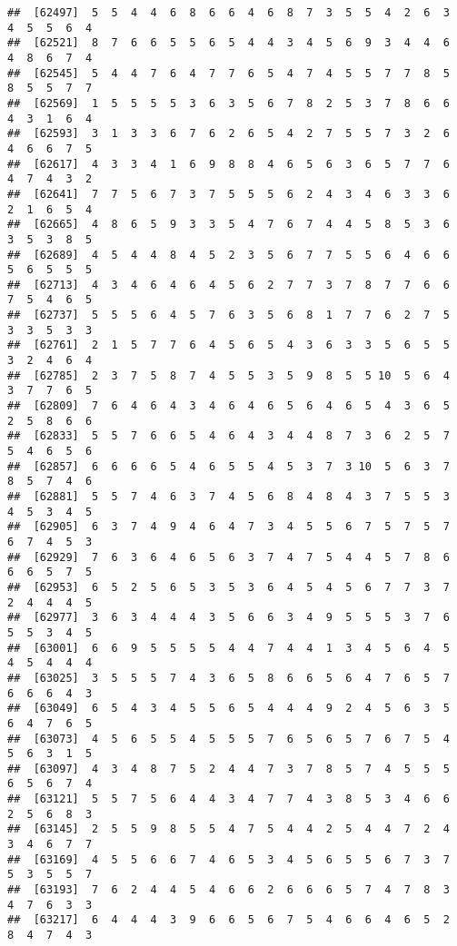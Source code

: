 \documentclass[
]{book}
\begin{document}
\begin{verbatim}
##  [62497]  5  5  4  4  6  8  6  6  4  6  8  7  3  5  5  4  2  6  3  4  5  5  6  4
##  [62521]  8  7  6  6  5  5  6  5  4  4  3  4  5  6  9  3  4  4  6  4  8  6  7  4
##  [62545]  5  4  4  7  6  4  7  7  6  5  4  7  4  5  5  7  7  8  5  8  5  5  7  7
##  [62569]  1  5  5  5  5  3  6  3  5  6  7  8  2  5  3  7  8  6  6  4  3  1  6  4
##  [62593]  3  1  3  3  6  7  6  2  6  5  4  2  7  5  5  7  3  2  6  4  6  6  7  5
##  [62617]  4  3  3  4  1  6  9  8  8  4  6  5  6  3  6  5  7  7  6  4  7  4  3  2
##  [62641]  7  7  5  6  7  3  7  5  5  5  6  2  4  3  4  6  3  3  6  2  1  6  5  4
##  [62665]  4  8  6  5  9  3  3  5  4  7  6  7  4  4  5  8  5  3  6  3  5  3  8  5
##  [62689]  4  5  4  4  8  4  5  2  3  5  6  7  7  5  5  6  4  6  6  5  6  5  5  5
##  [62713]  4  3  4  6  4  6  4  5  6  2  7  7  3  7  8  7  7  6  6  7  5  4  6  5
##  [62737]  5  5  5  6  4  5  7  6  3  5  6  8  1  7  7  6  2  7  5  3  3  5  3  3
##  [62761]  2  1  5  7  7  6  4  5  6  5  4  3  6  3  3  5  6  5  5  3  2  4  6  4
##  [62785]  2  3  7  5  8  7  4  5  5  3  5  9  8  5  5 10  5  6  4  3  7  7  6  5
##  [62809]  7  6  4  6  4  3  4  6  4  6  5  6  4  6  5  4  3  6  5  2  5  8  6  6
##  [62833]  5  5  7  6  6  5  4  6  4  3  4  4  8  7  3  6  2  5  7  5  4  6  5  6
##  [62857]  6  6  6  6  5  4  6  5  5  4  5  3  7  3 10  5  6  3  7  8  5  7  4  6
##  [62881]  5  5  7  4  6  3  7  4  5  6  8  4  8  4  3  7  5  5  3  4  5  3  4  5
##  [62905]  6  3  7  4  9  4  6  4  7  3  4  5  5  6  7  5  7  5  7  6  7  4  5  3
##  [62929]  7  6  3  6  4  6  5  6  3  7  4  7  5  4  4  5  7  8  6  6  6  5  7  5
##  [62953]  6  5  2  5  6  5  3  5  3  6  4  5  4  5  6  7  7  3  7  2  4  4  4  5
##  [62977]  3  6  3  4  4  4  3  5  6  6  3  4  9  5  5  5  3  7  6  5  5  3  4  5
##  [63001]  6  6  9  5  5  5  5  4  4  7  4  4  1  3  4  5  6  4  5  4  5  4  4  4
##  [63025]  3  5  5  5  7  4  3  6  5  8  6  6  5  6  4  7  6  5  7  6  6  6  4  3
##  [63049]  6  5  4  3  4  5  5  6  5  4  4  4  9  2  4  5  6  3  5  6  4  7  6  5
##  [63073]  4  5  6  5  5  4  5  5  5  7  6  5  6  5  7  6  7  5  4  5  6  3  1  5
##  [63097]  4  3  4  8  7  5  2  4  4  7  3  7  8  5  7  4  5  5  5  6  5  6  7  4
##  [63121]  5  5  7  5  6  4  4  3  4  7  7  4  3  8  5  3  4  6  6  2  5  6  8  3
##  [63145]  2  5  5  9  8  5  5  4  7  5  4  4  2  5  4  4  7  2  4  3  4  6  7  7
##  [63169]  4  5  5  6  6  7  4  6  5  3  4  5  6  5  5  6  7  3  7  5  3  5  5  7
##  [63193]  7  6  2  4  4  5  4  6  6  2  6  6  6  5  7  4  7  8  3  4  7  6  3  3
##  [63217]  6  4  4  4  3  9  6  6  5  6  7  5  4  6  6  4  6  5  2  8  4  7  4  3

\end{verbatim}
\end{document}
